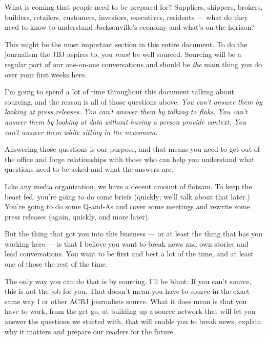\documentclass[
  11pt,
  american,
  letterpaperpaper,
  extrafontsizes,onecolumn,openright
  ]{memoir}
\begin{document}
What is coming that people need to be prepared for? Suppliers, shippers, brokers, builders, retailers, customers, investors, executives, residents --- what do they need to know to understand Jacksonville's economy and what's on the horizon?

\leavevmode{}%
\begin{greybox}[frametitle=Onboarding Path]
This might be the most important section in this entire document. To do the journalism the JBJ aspires to, you \emph{must} be well sourced. Sourcing will be a regular part of our one-on-one conversations and should be \emph{the} main thing you do over your first weeks here.

\end{greybox}

I'm going to spend a lot of time throughout this document talking about sourcing, and the reason is all of those questions above. \emph{You can't answer them by looking at press releases. You can't answer them by talking to flaks. You can't answer them by looking at data without having a person provide context. You can't answer them while sitting in the newsroom.}

Answering those questions is our purpose, and that means you need to get out of the office and forge relationships with those who can help you understand what questions need to be asked and what the answers are.

Like any media organization, we have a decent amount of flotsam. To keep the beast fed, you're going to do some briefs (quickly; we'll talk about that later.) You're going to do some Q-and-As and cover some meetings and rewrite some press releases (again, quickly, and more later).

But the thing that got you into this business --- or at least the thing that has you working here --- is that I believe you want to break news and own stories and lead conversations. You want to be first and best a lot of the time, and at least one of those the rest of the time.

The only way you can do that is by sourcing. I'll be blunt: If you can't source, this is not the job for you. That doesn't mean you have to source in the exact same way I or other ACBJ journalists source. What it does mean is that you have to work, from the get go, at building up a source network that will let you answer the questions we started with, that will enable you to break news, explain why it matters and prepare our readers for the future.
\end{document}
